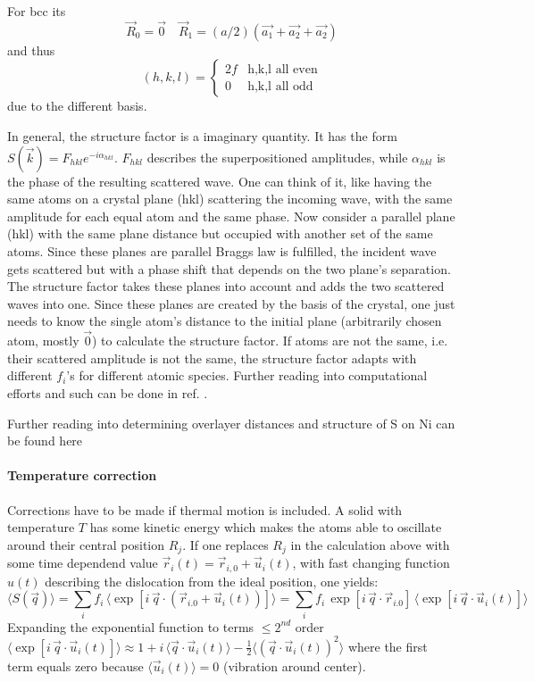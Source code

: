 For bcc its $$ \vec{R}_0 = \vec{0} \quad
 \vec{R}_1 = (a/2)(\vec{a_1} + \vec{a_2}+ \vec{a_2})$$ and thus 
 $$(h,k,l)=\begin{cases} 2f &\mbox{h,k,l all even}\\
                  0 &\mbox{h,k,l all odd} \end{cases}$$ due to the different basis.

In general, the structure factor is a imaginary quantity. It has the form $S(\vec k)=F_{hkl}e^{-i\alpha_{hkl}}$. $F_{hkl}$ describes the superpositioned amplitudes, while $\alpha_{hkl}$ is the phase of the resulting scattered wave. One can think of it, like having the same atoms on a crystal plane (hkl) scattering the incoming wave, with the same amplitude for each equal atom and the same phase. Now consider a parallel plane (hkl) with the same plane distance but occupied with another set of the same atoms. Since these planes are parallel Braggs law is fulfilled, the incident wave gets scattered but with a phase shift that depends on the two plane's separation. The structure factor takes these planes into account and adds the two scattered waves into one. Since these planes are created by the basis of the crystal, one just needs to know the single atom's distance to the initial plane (arbitrarily chosen atom, mostly $\vec 0$) to calculate the structure factor. If atoms are not the same, i.e. their scattered amplitude is not the same, the structure factor adapts with different $f_i$'s for different atomic species. Further reading into computational efforts and such can be done in ref. \cite{van_hove_surface_1979}.

Further reading into determining overlayer distances and structure of S on Ni can be found here \cite{demuth_small_1973,duke_structure_1973,andersson_surface_1972}
\paragraph{Temperature correction}
Corrections have to be made if thermal motion is included. A solid with temperature $T$ has some kinetic energy which makes the atoms able to oscillate around their central position $R_j$. If one replaces $R_j$ in the calculation above with some time dependend value $\vec r_i(t)=\vec r_{i,0}+\vec u_i(t)$, with fast changing function $u(t)$ describing the dislocation from the ideal position, one yields:
$$ \langle S(\vec q) \rangle =\sum_{i}f_{i}\,\langle\exp\left[i\,\vec{q}\cdot\left(\vec{r}_{i.0}+\vec{u}_{i}(t)\right)\right]\rangle=\sum_{i}f_{i}\,\exp\left[i\,\vec{q}\cdot\vec{r}_{i.0}\right]\,\langle\exp\left[i\,\vec{q}\cdot\vec{u}_{i}(t)\right]\rangle $$
Expanding the exponential function to terms $\leq 2^{nd}$ order 
$\langle \exp\left[i\,\vec{q}\cdot\vec{u}_{i}(t)\right] \rangle \approx 1+i\,\langle \vec{q}\cdot\vec{u}_{i}(t)\rangle-\frac{1}{2}\langle\left(\vec{q}\cdot\vec{u}_{i}(t)\right)^2\rangle$ where the first term equals zero because $\langle \vec{u}_i(t)\rangle=0$ (vibration around center).

